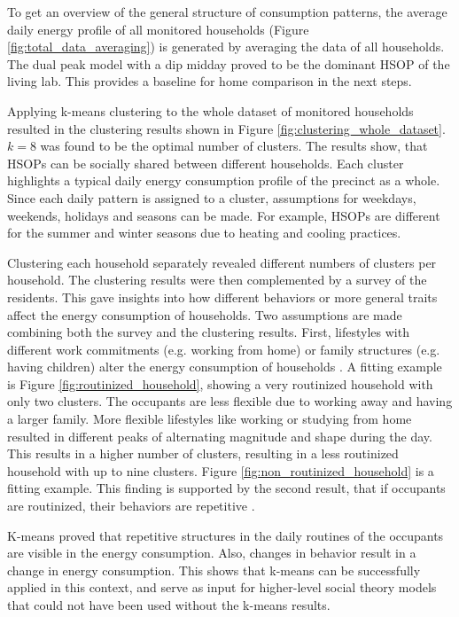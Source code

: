 To get an overview of the general structure of consumption patterns, the average daily energy profile of all monitored households (Figure \ref{fig:total_data_averaging}) is generated by averaging the data of all households.
The dual peak model with a dip midday proved to be the dominant HSOP of the living lab.
This provides a baseline for home comparison in the next steps.

Applying k-means clustering to the whole dataset of monitored households resulted in the clustering results shown in Figure \ref{fig:clustering_whole_dataset}.
$k=8$ was found to be the optimal number of clusters.
The results show, that HSOPs can be socially shared between different households.
Each cluster highlights a typical daily energy consumption profile of the precinct as a whole.
Since each daily pattern is assigned to a cluster, assumptions for weekdays, weekends, holidays and seasons can be made. 
For example, HSOPs are different for the summer and winter seasons due to heating and cooling practices.

Clustering each household separately revealed different numbers of clusters per household.
The clustering results were then complemented by a survey of the residents.
This gave insights into how different behaviors or more general traits affect the energy consumption of households.
Two assumptions are made combining both the survey and the clustering results.
First, lifestyles with different work commitments (e.g. working from home) or family structures (e.g. having children) alter the energy consumption of households \cite{KUR-HBP}.
A fitting example is Figure \ref{fig:routinized_household}, showing a very routinized household with only two clusters.
The occupants are less flexible due to working away and having a larger family.
More flexible lifestyles like working or studying from home resulted in different peaks of alternating magnitude and shape during the day.
This results in a higher number of clusters, resulting in a less routinized household with up to nine clusters.
Figure \ref{fig:non_routinized_household} is a fitting example.
This finding is supported by the second result, that if occupants are routinized, their behaviors are repetitive \cite{BRE-EWP}.

K-means proved that repetitive structures in the daily routines of the occupants are visible in the energy consumption.
Also, changes in behavior result in a change in energy consumption.
This shows that k-means can be successfully applied in this context, and serve as input for higher-level social theory models that could not have been used without the k-means results.

